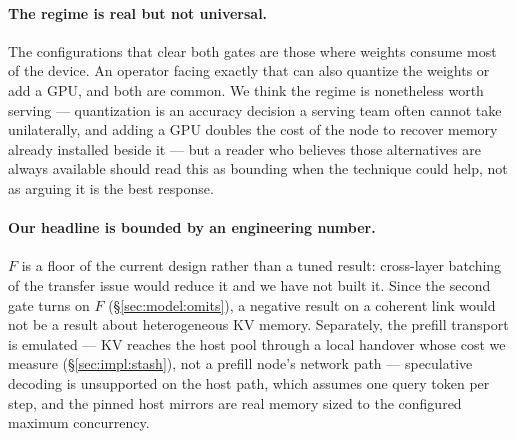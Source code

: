 \paragraph{The regime is real but not universal.} The configurations that clear
both gates are those where weights consume most of the device. An operator facing
exactly that can also quantize the weights or add a GPU, and both are common. We
think the regime is nonetheless worth serving --- quantization is an accuracy
decision a serving team often cannot take unilaterally, and adding a GPU doubles
the cost of the node to recover memory already installed beside it --- but a
reader who believes those alternatives are always available should read this as
bounding when the technique could help, not as arguing it is the best response.

\paragraph{Our headline is bounded by an engineering number.} $F$ is a floor of
the current design rather than a tuned result: cross-layer batching of the
transfer issue would reduce it and we have not built it. Since the second gate
turns on $F$ (\S\ref{sec:model:omits}), a negative result on a coherent link
would not be a result about heterogeneous KV memory. Separately, the prefill
transport is emulated --- KV reaches the host pool through a local handover whose
cost we measure (\S\ref{sec:impl:stash}), not a prefill node's network path ---
speculative decoding is unsupported on the host path, which assumes one query
token per step, and the pinned host mirrors are real memory sized to the
configured maximum concurrency.
